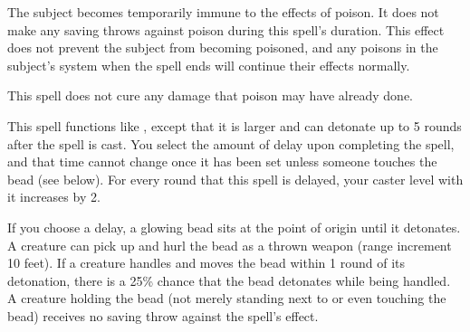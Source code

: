 \spellrng{\rngclose}
\spelldur{\durshort}
\begin{spelleffect}
  The subject becomes temporarily immune to the effects of poison. It does not make any saving throws against poison during this spell's duration. This effect does not prevent the subject from becoming poisoned, and any poisons in the subject's system when the spell ends will continue their effects normally. 
\end{spelleffect}
\begin{spellnotes}
  This spell does not cure any damage that poison may have already done.
\end{spellnotes}

\begin{spelleffect}
  This spell functions like , except that it is larger and can detonate up to 5 rounds after the spell is cast. You select the amount of delay upon completing the spell, and that time cannot change once it has been set unless someone touches the bead (see below). For every round that this spell is delayed, your caster level with it increases by 2.

  If you choose a delay, a glowing bead sits at the point of origin until it detonates. A creature can pick up and hurl the bead as a thrown weapon (range increment 10 feet). If a creature handles and moves the bead within 1 round of its detonation, there is a 25\% chance that the bead detonates while being handled. A creature holding the bead (not merely standing next to or even touching the bead) receives no saving throw against the spell's effect.
\end{spelleffect}

